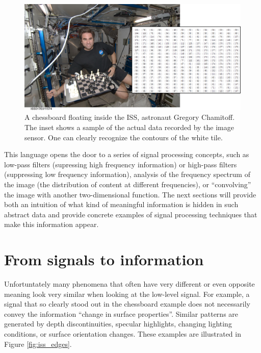 \begin{figure}[!htb]
	\centering
		\includegraphics[width=\textwidth]{figs/iss_closeupmatrix}
	\caption{A chessboard floating inside the ISS, astronaut Gregory Chamitoff. The inset shows a sample of the actual data recorded by the image sensor. One can clearly recognize the contours of the white tile.}
	\label{fig:iss_closeup}
\end{figure}

This language opens the door to a series of signal processing concepts, such as low-pass filters (supressing high frequency information) or high-pass filters (suppressing low frequency information), analysis of the frequency spectrum of the image (the distribution of content at different frequencies), or ``convolving'' the image with another two-dimensional function. The next sections will provide both an intuition of what kind of meaningful information is hidden in such abstract data and provide concrete examples of signal processing techniques that make this information appear.

\section{From signals to information}
Unfortuntately many phenomena that often have very different or even opposite meaning look very similar when looking at the low-level signal. For example, a signal that so clearly stood out in the chessboard example does not necessarily convey the information ``change in surface properties''. Similar patterns are generated by depth discontinuities, specular highlights, changing lighting conditions, or surface orientation changes. These examples are illustrated in Figure \ref{fig:iss_edges}.  

